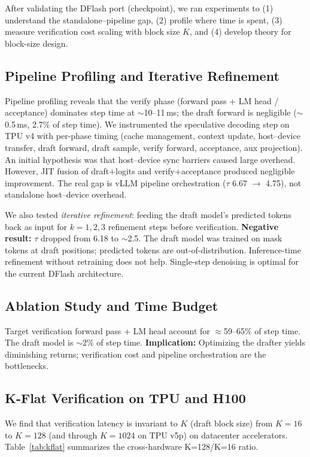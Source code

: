 \documentclass[12pt,letterpaper]{article}
\begin{document}
After validating the DFlash port (checkpoint), we ran experiments to (1) understand the standalone--pipeline gap, (2) profile where time is spent, (3) measure verification cost scaling with block size $K$, and (4) develop theory for block-size design.

\subsection{Pipeline Profiling and Iterative Refinement}

Pipeline profiling reveals that the verify phase (forward pass + LM head / acceptance) dominates step time at $\sim$10--11\,ms; the draft forward is negligible ($\sim$0.5\,ms, 2.7\% of step time). We instrumented the speculative decoding step on TPU v4 with per-phase timing (cache management, context update, host--device transfer, draft forward, draft sample, verify forward, acceptance, aux projection). An initial hypothesis was that host--device sync barriers caused large overhead. However, JIT fusion of draft+logits and verify+acceptance produced negligible improvement. The real gap is vLLM pipeline orchestration ($\tau$ 6.67 $\to$ 4.75), not standalone host--device overhead.

We also tested \emph{iterative refinement}: feeding the draft model's predicted tokens back as input for $k=1,2,3$ refinement steps before verification. \textbf{Negative result:} $\tau$ dropped from 6.18 to $\sim$2.5. The draft model was trained on mask tokens at draft positions; predicted tokens are out-of-distribution. Inference-time refinement without retraining does not help. Single-step denoising is optimal for the current DFlash architecture.

\subsection{Ablation Study and Time Budget}

Target verification forward pass + LM head account for $\approx$59--65\% of step time. The draft model is $\sim$2\% of step time. \textbf{Implication:} Optimizing the drafter yields diminishing returns; verification cost and pipeline orchestration are the bottlenecks.

\subsection{K-Flat Verification on TPU and H100}

We find that verification latency is invariant to $K$ (draft block size) from $K=16$ to $K=128$ (and through $K=1024$ on TPU v5p) on datacenter accelerators. Table~\ref{tab:kflat} summarizes the cross-hardware K=128/K=16 ratio.
\end{document}
